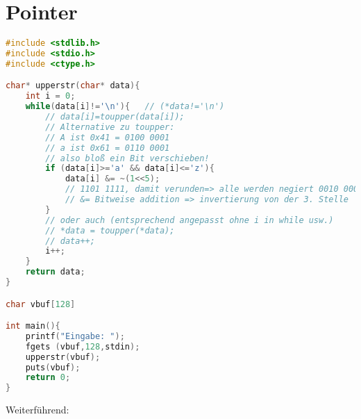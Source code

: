 \chapter{Pointer}

\begin{lstlisting}[language=C]
#include <stdlib.h>
#include <stdio.h>
#include <ctype.h>

char* upperstr(char* data){
	int i = 0;	
	while(data[i]!='\n'){	// (*data!='\n')
		// data[i]=toupper(data[i]);
		// Alternative zu toupper: 
		// A ist 0x41 = 0100 0001
		// a ist 0x61 = 0110 0001
		// also bloß ein Bit verschieben!
		if (data[i]>='a' && data[i]<='z'){
			data[i] &= ~(1<<5); 
			// 1101 1111, damit verunden=> alle werden negiert 0010 0000
			// &= Bitweise addition => invertierung von der 3. Stelle
		}
		// oder auch (entsprechend angepasst ohne i in while usw.)
		// *data = toupper(*data);
		// data++;
		i++;
	}
	return data;
}

char vbuf[128]

int main(){
	printf("Eingabe: ");
	fgets (vbuf,128,stdin);
	upperstr(vbuf);
	puts(vbuf);
	return 0;
}

\end{lstlisting}
Weiterführend:
